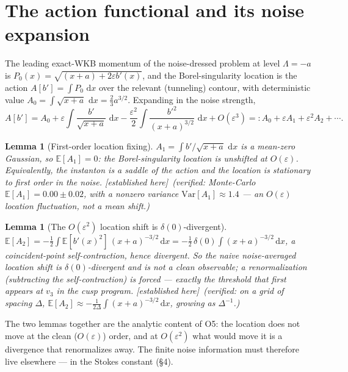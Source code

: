 \documentclass[11pt,reqno]{amsart}
\theoremstyle{plain}
\newtheorem{lemma}[proposition]{Lemma}
\theoremstyle{remark}
\newcommand{\dd}{\,\mathrm{d}}
\newcommand{\E}{\mathbb{E}}
\newcommand{\eps}{\varepsilon}
\newcommand{\OK}{{\footnotesize\textsf{[established here]}}}
\begin{document}
\section{The action functional and its noise expansion}

The leading exact-WKB momentum of the noise-dressed problem at level $\Lambda=-a$ is
$P_0(x)=\sqrt{(x+a)+2\eps b'(x)}$, and the Borel-singularity location is the action
$A[b']=\int P_0\,\dd x$ over the relevant (tunneling) contour, with deterministic value
$A_0=\int\sqrt{x+a}\,\dd x=\tfrac23 a^{3/2}$. Expanding in the noise strength,
\begin{equation}\label{eq:expand}
A[b']=A_0+\eps\!\int\!\frac{b'}{\sqrt{x+a}}\,\dd x
-\frac{\eps^2}{2}\!\int\!\frac{b'^2}{(x+a)^{3/2}}\,\dd x+O(\eps^3)
=:A_0+\eps A_1+\eps^2 A_2+\cdots.
\end{equation}

\begin{lemma}[First-order location fixing]\label{lem:first}
$A_1=\int b'/\sqrt{x+a}\,\dd x$ is a mean-zero Gaussian, so $\E[A_1]=0$: the Borel-singularity
location is unshifted at $O(\eps)$. Equivalently, the instanton is a saddle of the action and the
location is stationary to first order in the noise. \OK\ \emph{(verified: Monte-Carlo
$\E[A_1]=0.00\pm0.02$, with a nonzero variance $\mathrm{Var}[A_1]\approx1.4$ --- an $O(\eps)$
location \emph{fluctuation}, not a mean shift.)}
\end{lemma}

\begin{lemma}[The $O(\eps^2)$ location shift is $\delta(0)$-divergent]\label{lem:delta}
$\E[A_2]=-\tfrac12\int \E[b'(x)^2]\,(x+a)^{-3/2}\dd x
=-\tfrac12\,\delta(0)\!\int (x+a)^{-3/2}\dd x$, a coincident-point self-contraction, hence
divergent. So the naive noise-averaged location shift is $\delta(0)$-divergent and is \emph{not} a
clean observable; a renormalization (subtracting the self-contraction) is forced --- exactly the
threshold that first appears at $v_3$ in the cusp program. \OK\ \emph{(verified: on a grid of
spacing $\Delta$, $\E[A_2]\approx-\tfrac1{2\Delta}\int(x+a)^{-3/2}\dd x$, growing as $\Delta^{-1}$.)}
\end{lemma}

The two lemmas together are the analytic content of O5: the location does not move at the clean
($O(\eps)$) order, and at $O(\eps^2)$ what would move it is a divergence that renormalizes away.
The finite noise information must therefore live elsewhere --- in the Stokes constant (\S4).
\end{document}
